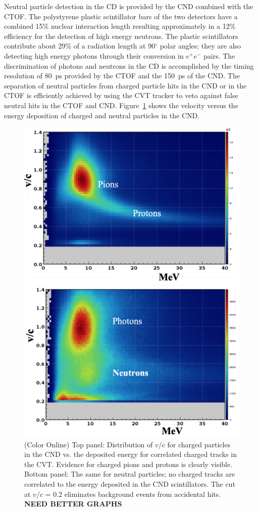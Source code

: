 \documentclass[final,3p,twocolumn]{elsarticle}
\begin{document}
Neutral particle detection in the CD is provided by the CND combined with the CTOF. The polystyrene plastic
scintillator bars of the two detectors have a combined 15\% nuclear interaction length resulting approximately in
a 12\% efficiency for the detection of high energy neutrons. The plastic scintillators contribute about 29\% of a
radiation length at 90$^\circ$ polar angles; they are also detecting high energy photons through their conversion
in $e^+e^-$ pairs. The discrimination of photons and neutrons in the CD is  accomplished by the timing resolution of
80~ps provided by the CTOF and the 150~ps of the CND. The separation of neutral particles from charged
particle hits in the CND or in the CTOF is efficiently achieved by using the CVT tracker to veto against false neutral
hits in the CTOF and CND. Figure~\ref{CND-neutrals} shows the velocity versus the energy deposition of charged
and neutral particles in the CND.  

\begin{figure}[htbp!]
\centerline{\includegraphics[width=0.9\columnwidth]{CND1.png}}
\centerline{\includegraphics[width=0.9\columnwidth]{CND2.png}}
\caption{(Color Online) Top panel: Distribution of $v/c$ for charged particles in the CND vs. the deposited energy for correlated
charged tracks in the CVT. Evidence for charged pions and protons is clearly visible.  Bottom panel: The same for
neutral particles; no charged tracks are correlated to the energy deposited in the CND scintillators. The cut at
$v/c$ = 0.2 eliminates background events from accidental hits. {\bf NEED BETTER GRAPHS}} 
\label{CND-neutrals}
\end{figure} 
\end{document}
